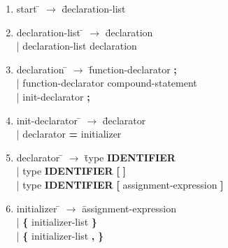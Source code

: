 \documentclass[12pt]{article}
\begin{document}
\small
\begin{enumerate}
\item \begin{tabbing} start \= $\rightarrow$ \= declaration-list \\
\end{tabbing}

\item \begin{tabbing} declaration-list \= $\rightarrow$ \= declaration \\
	\> \hspace*{0.05cm} | \> declaration-list declaration
\end{tabbing}

\item \begin{tabbing} declaration \= $\rightarrow$ \= function-declarator \textbf{;} \\
	\> \hspace*{0.05cm} | \> function-declarator compound-statement \\
	\> \hspace*{0.05cm} | \> init-declarator \textbf{;}
\end{tabbing}

\item \begin{tabbing} init-declarator \= $\rightarrow$ \= declarator \\
	\> \hspace*{0.05cm} | \> declarator \textbf{=} initializer
\end{tabbing}

\item \begin{tabbing} declarator \= $\rightarrow$ \= type \textbf{IDENTIFIER} \\
	\> \hspace*{0.05cm} | \> type \textbf{IDENTIFIER} \textbf{[} \textbf{]} \\
	\> \hspace*{0.05cm} | \> type \textbf{IDENTIFIER} \textbf{[} assignment-expression \textbf{]}
\end{tabbing}

\item \begin{tabbing} initializer \= $\rightarrow$ \= assignment-expression \\
	\> \hspace*{0.05cm} | \> \textbf{\{} initializer-list \textbf{\}} \\
	\> \hspace*{0.05cm} | \> \textbf{\{} initializer-list \textbf{,} \textbf{\}}
\end{tabbing}


\end{enumerate}
\end{document}
